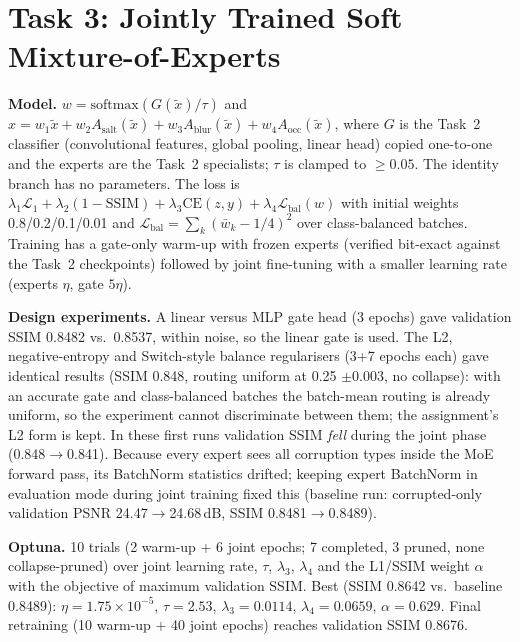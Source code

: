 \documentclass[conference]{IEEEtran}
\begin{document}
\section{Task 3: Jointly Trained Soft Mixture-of-Experts}
\textbf{Model.} $w=\mathrm{softmax}(G(\tilde x)/\tau)$ and $\hat x=w_1\tilde x+w_2A_\text{salt}(\tilde x)+w_3A_\text{blur}(\tilde x)+w_4A_\text{occ}(\tilde x)$, where $G$ is the Task~2 classifier (convolutional features, global pooling, linear head) copied one-to-one and the experts are the Task~2 specialists; $\tau$ is clamped to $\ge0.05$. The identity branch has no parameters. The loss is $\lambda_1\mathcal{L}_1+\lambda_2(1-\mathrm{SSIM})+\lambda_3\mathrm{CE}(z,y)+\lambda_4\mathcal{L}_\text{bal}(w)$ with initial weights 0.8/0.2/0.1/0.01 and $\mathcal{L}_\text{bal}=\sum_k(\bar w_k-1/4)^2$ over class-balanced batches. Training has a gate-only warm-up with frozen experts (verified bit-exact against the Task~2 checkpoints) followed by joint fine-tuning with a smaller learning rate (experts $\eta$, gate $5\eta$).

\textbf{Design experiments.} A linear versus MLP gate head (3 epochs) gave validation SSIM 0.8482 vs.\ 0.8537, within noise, so the linear gate is used. The L2, negative-entropy and Switch-style balance regularisers (3+7 epochs each) gave identical results (SSIM 0.848, routing uniform at 0.25 $\pm$0.003, no collapse): with an accurate gate and class-balanced batches the batch-mean routing is already uniform, so the experiment cannot discriminate between them; the assignment's L2 form is kept. In these first runs validation SSIM \emph{fell} during the joint phase (0.848$\to$0.841). Because every expert sees all corruption types inside the MoE forward pass, its BatchNorm statistics drifted; keeping expert BatchNorm in evaluation mode during joint training fixed this (baseline run: corrupted-only validation PSNR 24.47$\to$24.68\,dB, SSIM 0.8481$\to$0.8489).

\textbf{Optuna.} 10 trials (2 warm-up + 6 joint epochs; 7 completed, 3 pruned, none collapse-pruned) over joint learning rate, $\tau$, $\lambda_3$, $\lambda_4$ and the L1/SSIM weight $\alpha$ with the objective of maximum validation SSIM. Best (SSIM 0.8642 vs.\ baseline 0.8489): $\eta=1.75\times10^{-5}$, $\tau=2.53$, $\lambda_3=0.0114$, $\lambda_4=0.0659$, $\alpha=0.629$. Final retraining (10 warm-up + 40 joint epochs) reaches validation SSIM 0.8676.
\end{document}
